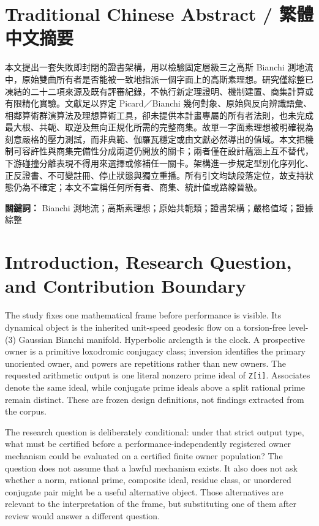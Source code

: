 \documentclass[11pt,a4paper]{article}
\begin{document}
\begin{otherlanguage}{chinese-traditional}
\section*{Traditional Chinese Abstract / 繁體中文摘要}
本文提出一套失敗即封閉的證書架構，用以檢驗固定層級三之高斯 Bianchi 測地流中，原始雙曲所有者是否能被一致地指派一個字面上的高斯素理想。研究僅綜整已凍結的二十二項來源及既有評審紀錄，不執行新定理證明、機制建置、商集計算或有限精化實驗。文獻足以界定 Picard／Bianchi 幾何對象、原始與反向辨識語彙、相鄰算術群演算法及理想算術工具，卻未提供本計畫專屬的所有者法則，也未完成最大根、共軛、取逆及無向正規化所需的完整商集。故單一字面素理想被明確視為刻意嚴格的壓力測試，而非典範、伽羅瓦穩定或由文獻必然導出的值域。本文把機制可容許性與商集完備性分成兩道仍開放的關卡；兩者僅在設計蘊涵上互不替代，下游碰撞分離表現不得用來選擇或修補任一關卡。架構進一步規定型別化序列化、正反證書、不可變註冊、停止狀態與獨立重播。所有引文均缺段落定位，故支持狀態仍為不確定；本文不宣稱任何所有者、商集、統計值或路線晉級。

\noindent\textbf{關鍵詞：} Bianchi 測地流；高斯素理想；原始共軛類；證書架構；嚴格值域；證據綜整
\end{otherlanguage}

\section{Introduction, Research Question, and Contribution Boundary}

The study fixes one mathematical frame before performance is visible. Its dynamical object is the inherited unit-speed geodesic flow on a torsion-free level-(3) Gaussian Bianchi manifold. Hyperbolic arclength is the clock. A prospective owner is a primitive loxodromic conjugacy class; inversion identifies the primary unoriented owner, and powers are repetitions rather than new owners. The requested arithmetic output is one literal nonzero prime ideal of \texttt{Z{[}i{]}}. Associates denote the same ideal, while conjugate prime ideals above a split rational prime remain distinct. These are frozen design definitions, not findings extracted from the corpus.

The research question is deliberately conditional: under that strict output type, what must be certified before a performance-independently registered owner mechanism could be evaluated on a certified finite owner population? The question does not assume that a lawful mechanism exists. It also does not ask whether a norm, rational prime, composite ideal, residue class, or unordered conjugate pair might be a useful alternative object. Those alternatives are relevant to the interpretation of the frame, but substituting one of them after review would answer a different question.
\end{document}
